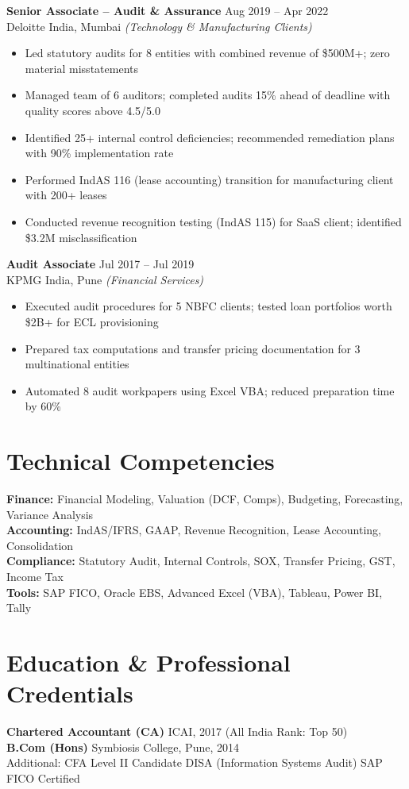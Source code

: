 \documentclass[10.5pt,a4paper]{article}
\begin{document}
\textbf{Senior Associate -- Audit \& Assurance} \hfill Aug 2019 -- Apr 2022\\
Deloitte India, Mumbai \textit{(Technology \& Manufacturing Clients)}
\begin{itemize}
    \item Led statutory audits for 8 entities with combined revenue of \$500M+; zero material misstatements
    \item Managed team of 6 auditors; completed audits 15\% ahead of deadline with quality scores above 4.5/5.0
    \item Identified 25+ internal control deficiencies; recommended remediation plans with 90\% implementation rate
    \item Performed IndAS 116 (lease accounting) transition for manufacturing client with 200+ leases
    \item Conducted revenue recognition testing (IndAS 115) for SaaS client; identified \$3.2M misclassification
\end{itemize}

\textbf{Audit Associate} \hfill Jul 2017 -- Jul 2019\\
KPMG India, Pune \textit{(Financial Services)}
\begin{itemize}
    \item Executed audit procedures for 5 NBFC clients; tested loan portfolios worth \$2B+ for ECL provisioning
    \item Prepared tax computations and transfer pricing documentation for 3 multinational entities
    \item Automated 8 audit workpapers using Excel VBA; reduced preparation time by 60\%
\end{itemize}

\section{Technical Competencies}
\textbf{Finance:} Financial Modeling, Valuation (DCF, Comps), Budgeting, Forecasting, Variance Analysis\\
\textbf{Accounting:} IndAS/IFRS, GAAP, Revenue Recognition, Lease Accounting, Consolidation\\
\textbf{Compliance:} Statutory Audit, Internal Controls, SOX, Transfer Pricing, GST, Income Tax\\
\textbf{Tools:} SAP FICO, Oracle EBS, Advanced Excel (VBA), Tableau, Power BI, Tally

\section{Education \& Professional Credentials}
\textbf{Chartered Accountant (CA)} \hfill ICAI, 2017 (All India Rank: Top 50)\\
\textbf{B.Com (Hons)} \hfill Symbiosis College, Pune, 2014\\[4pt]
Additional: CFA Level II Candidate \quad\textbar\quad DISA (Information Systems Audit) \quad\textbar\quad SAP FICO Certified
\end{document}
